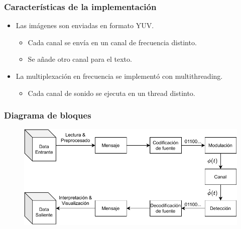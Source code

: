 \documentclass[aspectratio=169]{beamer}
\begin{document}
\begin{frame}

	\frametitle{Características de la implementación}

	\begin{itemize}
		\item Las imágenes son enviadas en formato YUV.
		      \begin{itemize}
			      \item Cada canal se envía en un canal de frecuencia distinto.
			      \item Se añade otro canal para el texto.
		      \end{itemize}
		\item La multiplexación en frecuencia se implementó con multithreading.
		      \begin{itemize}
			      \item Cada canal de sonido se ejecuta en un thread distinto.
		      \end{itemize}
	\end{itemize}

\end{frame}


\begin{frame}

	\frametitle{Diagrama de bloques}

	\begin{figure}[H]
		\centering
		\includegraphics[width=.9\linewidth]{p2-blocks.pdf}
	\end{figure}

\end{frame}

\end{document}
